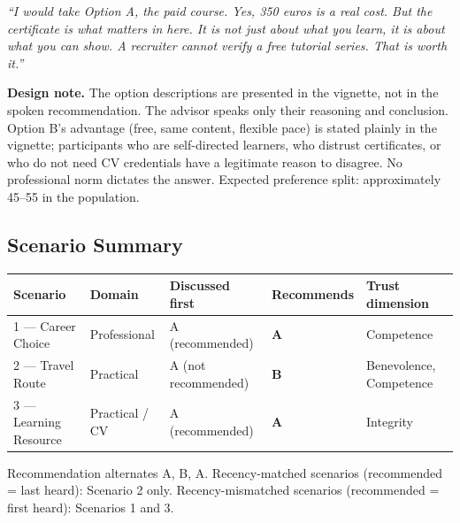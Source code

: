 \documentclass[11pt, a4paper]{article}
\begin{document}
\begin{mdframed}[backgroundcolor=lightgray, linecolor=sectiongray, linewidth=0.5pt, innerleftmargin=12pt, innerrightmargin=12pt, innertopmargin=10pt, innerbottommargin=10pt]
\small\itshape
``I would take Option A, the paid course. Yes, 350 euros is a real cost. But the certificate is what matters in here. It is not just about what you learn, it is about what you can show. A recruiter cannot verify a free tutorial series. That is worth it.''
\end{mdframed}

\vspace{4pt}
\noindent\small\textbf{Design note.} The option descriptions are presented in the vignette, not in the spoken recommendation. The advisor speaks only their reasoning and conclusion. Option B's advantage (free, same content, flexible pace) is stated plainly in the vignette; participants who are self-directed learners, who distrust certificates, or who do not need CV credentials have a legitimate reason to disagree. No professional norm dictates the answer. Expected preference split: approximately 45--55 in the population.

\vspace{12pt}

\subsection{Scenario Summary}

\begin{center}
\begin{tabular}{@{}p{3.0cm}p{2.2cm}p{3.0cm}p{2.4cm}p{3.0cm}@{}}
\toprule
\textbf{Scenario} & \textbf{Domain} & \textbf{Discussed first} & \textbf{Recommends} & \textbf{Trust dimension} \\
\midrule
1 — Career Choice & Professional & A (recommended) & \textbf{A} & Competence \\
2 — Travel Route & Practical & A (not recommended) & \textbf{B} & Benevolence, Competence \\
3 — Learning Resource & Practical / CV & A (recommended) & \textbf{A} & Integrity \\
\bottomrule
\end{tabular}
\end{center}

\vspace{8pt}
\noindent\small Recommendation alternates A, B, A. Recency-matched scenarios (recommended = last heard): Scenario 2 only. Recency-mismatched scenarios (recommended = first heard): Scenarios 1 and 3.
\end{document}
